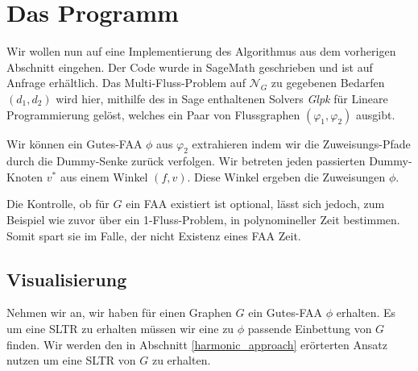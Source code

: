 \chapter{Das Programm}\label{the_program}

Wir wollen nun auf eine Implementierung des Algorithmus aus dem vorherigen Abschnitt eingehen. Der Code wurde in SageMath \cite{sage} geschrieben und ist auf Anfrage erhältlich. Das Multi-Fluss-Problem auf $\mathcal{N}_G$ zu gegebenen Bedarfen $(d_1,d_2)$ wird hier, mithilfe des in Sage enthaltenen Solvers \textit{Glpk} \cite{glpk} für Lineare Programmierung gelöst, welches ein Paar von Flussgraphen $(\varphi_1,\varphi_2)$ ausgibt.



Wir können ein Gutes-FAA $\phi$ aus $\varphi_2$ extrahieren indem wir die Zuweisungs-Pfade durch die Dummy-Senke zurück verfolgen. Wir betreten jeden passierten Dummy-Knoten $v^*$ aus einem Winkel $(f,v)$. Diese Winkel ergeben die Zuweisungen $\phi$.

\begin{remark}
Die Kontrolle, ob für $G$ ein FAA existiert ist optional, lässt sich jedoch, zum Beispiel wie zuvor über ein 1-Fluss-Problem, in polynomineller Zeit bestimmen. Somit spart sie im Falle, der nicht Existenz eines FAA Zeit.
\end{remark}

\section{Visualisierung}

Nehmen wir an, wir haben für einen Graphen $G$ ein Gutes-FAA $\phi$ erhalten. Es um eine SLTR zu erhalten müssen wir eine zu $\phi$ passende Einbettung von $G$ finden.  Wir werden den in Abschnitt \ref{harmonic_approach} erörterten Ansatz nutzen um eine SLTR von $G$ zu erhalten.

